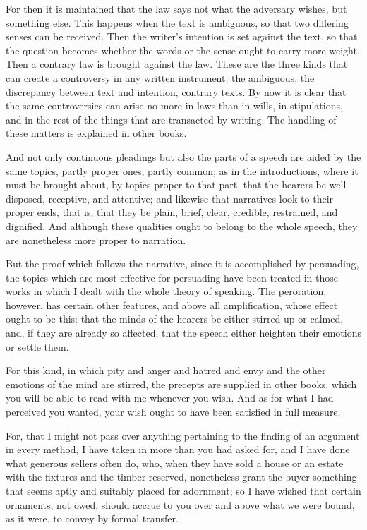  For then it is maintained that the law says not what the adversary wishes, but something else. This happens when the text is ambiguous, so that two differing senses can be received. Then the writer's intention is set against the text, so that the question becomes whether the words or the sense ought to carry more weight. Then a contrary law is brought against the law. These are the three kinds that can create a controversy in any written instrument: the ambiguous, the discrepancy between text and intention, contrary texts. By now it is clear that the same controversies can arise no more in laws than in wills, in stipulations, and in the rest of the things that are transacted by writing. The handling of these matters is explained in other books.

 And not only continuous pleadings but also the parts of a speech are aided by the same topics, partly proper ones, partly common; as in the introductions, where it must be brought about, by topics proper to that part, that the hearers be well disposed, receptive, and attentive; and likewise that narratives look to their proper ends, that is, that they be plain, brief, clear, credible, restrained, and dignified. And although these qualities ought to belong to the whole speech, they are nonetheless more proper to narration.

 But the proof which follows the narrative, since it is accomplished by persuading, the topics which are most effective for persuading have been treated in those works in which I dealt with the whole theory of speaking. The peroration, however, has certain other features, and above all amplification, whose effect ought to be this: that the minds of the hearers be either stirred up or calmed, and, if they are already so affected, that the speech either heighten their emotions or settle them.

 For this kind, in which pity and anger and hatred and envy and the other emotions of the mind are stirred, the precepts are supplied in other books, which you will be able to read with me whenever you wish. And as for what I had perceived you wanted, your wish ought to have been satisfied in full measure.

 For, that I might not pass over anything pertaining to the finding of an argument in every method, I have taken in more than you had asked for, and I have done what generous sellers often do, who, when they have sold a house or an estate with the fixtures and the timber reserved, nonetheless grant the buyer something that seems aptly and suitably placed for adornment; so I have wished that certain ornaments, not owed, should accrue to you over and above what we were bound, as it were, to convey by formal transfer.

